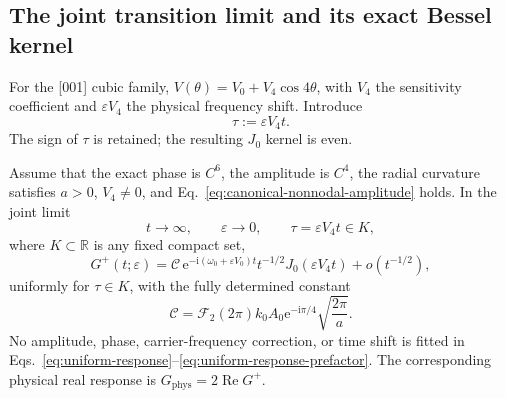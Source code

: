 \subsection{The joint transition limit and its exact Bessel kernel}

For the [001] cubic family,
\(V(\theta)=V_0+V_4\cos4\theta\), with \(V_4\) the sensitivity coefficient
and \(\varepsilon V_4\) the physical frequency shift.  Introduce
\begin{equation}
  \tau:=\varepsilon V_4t.
  \label{eq:green-transition-variable}
\end{equation}
The sign of \(\tau\) is retained; the resulting \(J_0\) kernel is even.

\begin{theorem}
\label{thm:uniform-bessel-crossover}
Assume that the exact phase is \(C^6\), the amplitude is \(C^4\), the
radial curvature satisfies \(a>0\), \(V_4\ne0\), and
Eq.~\eqref{eq:canonical-nonnodal-amplitude} holds.  In the joint limit
\begin{equation}
  t\longrightarrow\infty,
  \qquad
  \varepsilon\longrightarrow0,
  \qquad
  \tau=\varepsilon V_4t\in K,
  \label{eq:distinguished-joint-limit}
\end{equation}
where \(K\subset\mathbb R\) is any fixed compact set,
\begin{equation}
  G^{+}(t;\varepsilon)
  =\mathcal C\,
    \mathrm e^{-\mathrm i(\omega_0+\varepsilon V_0)t}
    t^{-1/2}J_0(\varepsilon V_4t)
    +o(t^{-1/2}),
  \label{eq:uniform-response}
\end{equation}
uniformly for \(\tau\in K\), with the fully determined constant
\begin{equation}
  \mathcal C
  =\mathscr F_2(2\pi)k_0A_0
    \mathrm e^{-\mathrm i\pi/4}
    \sqrt{\frac{2\pi}{a}}.
  \label{eq:uniform-response-prefactor}
\end{equation}
No amplitude, phase, carrier-frequency correction, or time shift is fitted
in Eqs.~\eqref{eq:uniform-response}--\eqref{eq:uniform-response-prefactor}.
The corresponding physical real response is
\(G_{\mathrm{phys}}=2\operatorname{Re}G^{+}\).
\end{theorem}

